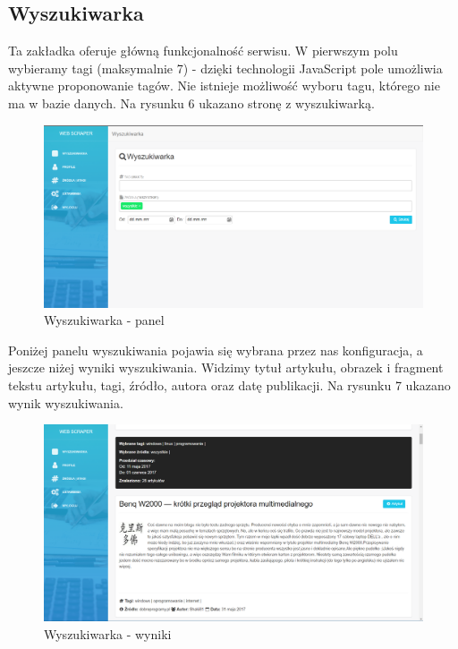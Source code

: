 \documentclass[12pt, titlepage]{article}
\begin{document}
	\newpage
	\subsection{Wyszukiwarka}
	Ta zakładka oferuje główną funkcjonalność serwisu. W pierwszym polu wybieramy tagi (maksymalnie 7) - dzięki technologii JavaScript pole umożliwia aktywne proponowanie tagów.
	Nie istnieje możliwość wyboru tagu, którego nie ma w bazie danych. Na rysunku 6 ukazano stronę z wyszukiwarką.
	\begin{figure}[H]
	\centering
	\includegraphics[scale=0.45]{obrazki/wyszukiwarka.png}
	\caption{Wyszukiwarka - panel}
	\label{fig:db_schema}
	\end{figure}
	\newpage
	Poniżej panelu wyszukiwania pojawia się wybrana przez nas konfiguracja, a jeszcze niżej wyniki wyszukiwania. Widzimy tytuł artykułu, obrazek i fragment tekstu artykułu, tagi, źródło, autora oraz datę publikacji. Na rysunku 7 ukazano wynik wyszukiwania.
	\begin{figure}[H]
		\centering
		\includegraphics[scale=0.27]{obrazki/wyszukiwarka2.png}
		\caption{Wyszukiwarka - wyniki}
		\label{fig:db_schema}
	\end{figure}


	\newpage
\end{document}
